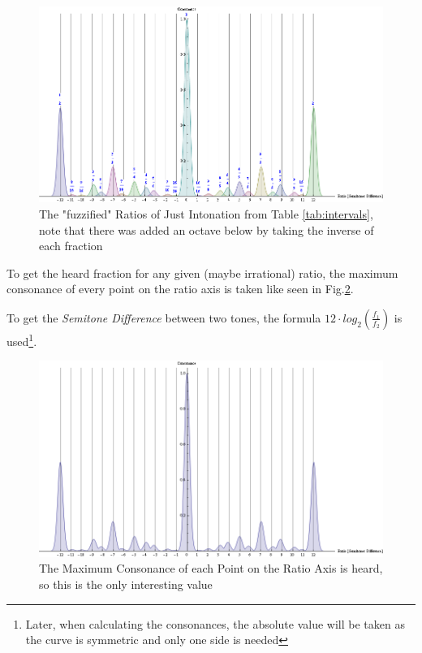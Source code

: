 \documentclass[12pt,a4paper,titlepage,oneside]{report}
\begin{document}
\begin{figure}[!ht]
\includegraphics[width=\textwidth]{images/just_bell.png}
\centering
\caption{The "fuzzified" Ratios of Just Intonation from Table \ref{tab:intervals}, note that there was added an octave below by taking the inverse of each fraction}
\label{fig:just_bell}
\end{figure}

To get the heard fraction for any given (maybe irrational) ratio, the maximum consonance of every point on the ratio axis is taken like seen in Fig.\ref{fig:just_bell_max}.

To get the \textit{Semitone Difference} between two tones, the formula $12 \cdot log_2(\frac{f_1}{f_2})$ is used\footnote{Later, when calculating the consonances, the absolute value will be taken as the curve is symmetric and only one side is needed}.

\begin{figure}[!ht]
\includegraphics[width=\textwidth]{images/just_bell_max.png}
\centering
\caption{The Maximum Consonance of each Point on the Ratio Axis is heard, so this is the only interesting value}
\label{fig:just_bell_max}
\end{figure}
\end{document}

